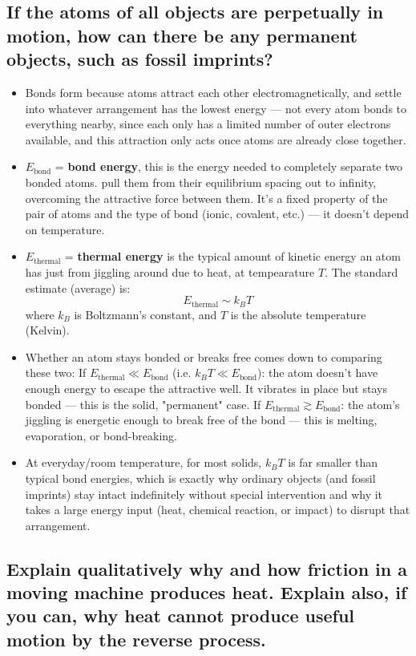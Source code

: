\documentclass{article}
\begin{document}
\subsection{If the atoms of all objects are perpetually in motion, how can there be any permanent objects, such as fossil imprints?}
\begin{itemize}
    \item Bonds form because atoms attract each other electromagnetically, and settle into whatever arrangement has the lowest energy — not every atom bonds to everything nearby, since each only has a limited number of outer electrons available, and this attraction only acts once atoms are already close together.
    \item $E_{\text{bond}}$ = \textbf{bond energy}, this is the energy needed to completely separate two bonded atoms. pull them from their equilibrium spacing out to infinity, overcoming the attractive force between them. It's a fixed property of the pair of atoms and the type of bond (ionic, covalent, etc.) — it doesn't depend on temperature.
    \item $E_{\text{thermal}}$ = \textbf{thermal energy} is the typical amount of kinetic energy an atom has just from jiggling around due to heat, at tempearature $T$. The standard estimate (average) is: $$E_{\text{thermal}} \sim k_B T$$
    where $k_B$ is Boltzmann's constant, and $T$ is the absolute temperature (Kelvin). 
    \item Whether an atom stays bonded or breaks free comes down to comparing these two:
    \subitem If $E_{\text{thermal}} \ll E_{\text{bond}}$ (i.e. $k_B T \ll E_{\text{bond}}$): the atom doesn't have enough energy to escape the attractive well. It
    vibrates in place but stays bonded — this is the solid, "permanent" case.
    \subitem If $E_{\text{thermal}} \gtrsim E_{\text{bond}}$: the atom's jiggling is energetic enough to break free of the bond — this is melting, evaporation, or
    bond-breaking.

    \item At everyday/room temperature, for most solids, $k_B T$ is far smaller than typical bond energies, which is exactly why ordinary objects (and fossil imprints) stay intact indefinitely without special intervention and why it takes a large energy input (heat, chemical reaction, or impact) to disrupt that arrangement.
\end{itemize}

\subsection{Explain qualitatively why and how friction in a moving machine produces heat. Explain also, if you can, why heat cannot produce useful motion by the reverse process.}
\end{document}
